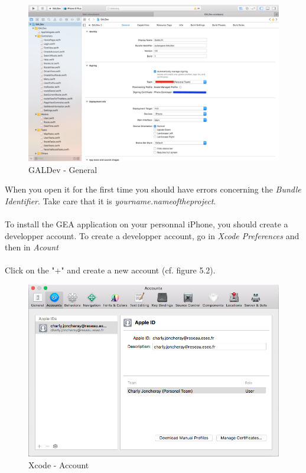 \begin{figure}[h!]
\begin{center}
\includegraphics[scale = 0.25]{diagrams/Xcode-General.png} 
\end{center}
\caption{GALDev - General}
\end{figure}
When you open it for the first time you should have errors concerning the \textit{Bundle Identifier}. Take care that it is \textit{yourname.nameoftheproject}.
\\\\
To install the GEA application on your personnal iPhone, you should create a developper account. To create a developper account, go in \textit{Xcode Preferences} and then in \textit{Acount}
\\\\
Click on the "+" and create a new account (cf. figure 5.2). 
\begin{figure}[h!]
\begin{center}
\includegraphics[scale = 0.5]{diagrams/createAnAccount.png} 
\end{center}
\caption{Xcode - Account}
\end{figure}
